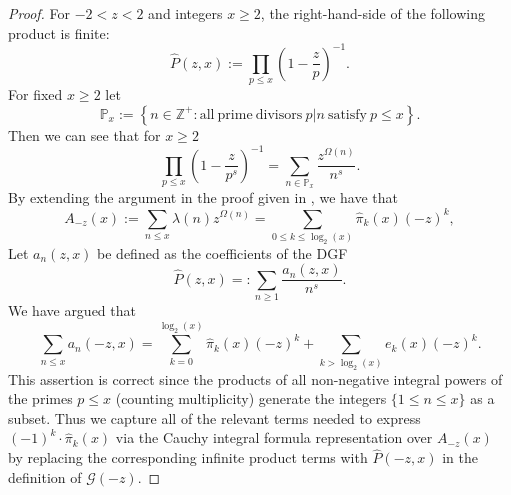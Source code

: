\documentclass[11pt,reqno,a4letter]{article}
\numberwithin{figure}{section}
\numberwithin{table}{section}
\theoremstyle{plain}
\numberwithin{theorem}{section}
\theoremstyle{definition}
\begin{document}
\begin{proof}
\label{proofOf_theorem_GFs_SymmFuncs_SumsOfRecipOfPowsOfPrimes} 
For $-2 < z < 2$ and integers $x \geq 2$, 
the right-hand-side of the following product is finite: 
\[
\widehat{P}(z, x) := \prod_{p \leq x} \left(1 - \frac{z}{p}\right)^{-1}. 
\]
For fixed $x \geq 2$ let 
\[
\mathbb{P}_x := \left\{n \in \mathbb{Z}^{+}: \mathrm{ all\ prime\ divisors\ } 
     p|n \mathrm{\ satisfy\ } p \leq x\right\}. 
\]
Then we can see that for $x \geq 2$ 
\begin{equation} 
\label{eqn_proof_tag_PHatFiniteTruncProdFactorOfGz_v2} 
\prod_{p \leq x} \left(1 - \frac{z}{p^s}\right)^{-1} = \sum_{n \in \mathbb{P}_x} 
     \frac{z^{\Omega(n)}}{n^s}. 
\end{equation} 
By extending the argument in the proof given in 
\cite[\S 7.4]{MV}, we have that 
\[
A_{-z}(x) := \sum_{n \leq x} \lambda(n) z^{\Omega(n)} = 
     \sum_{0 \leq k \leq \log_2(x)} \widehat{\pi}_k(x) (-z)^k, 
\] 
Let $a_n(z, x)$ be defined as the coefficients of the DGF 
\[
\widehat{P}(z, x) =: \sum_{n \geq 1} \frac{a_n(z, x)}{n^s}. 
\]
We have argued that 
\[
\sum_{n \leq x} a_n(-z, x) = 
     \sum_{k=0}^{\log_2(x)} \widehat{\pi}_k(x) (-z)^k + 
     \sum_{k > \log_2(x)} e_k(x) (-z)^{k}. 
\]
This assertion is correct since the products of all non-negative integral powers of the 
primes $p \leq x$ (counting multiplicity) 
generate the integers $\{1 \leq n \leq x\}$ as a subset. 
Thus we capture all of the relevant terms needed to express 
$(-1)^{k} \cdot \widehat{\pi}_k(x)$ 
via the Cauchy integral formula representation over $A_{-z}(x)$ by 
replacing the corresponding infinite product terms with 
$\widehat{P}(-z, x)$ in the definition of $\mathcal{G}(-z)$. 


\end{proof}
\end{document}
